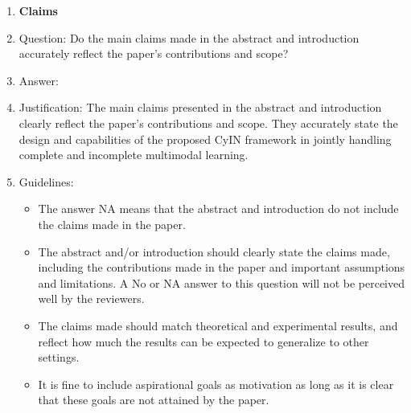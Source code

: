 \documentclass{article}
\begin{document}
\begin{enumerate}

\item {\bf Claims}
    \item[] Question: Do the main claims made in the abstract and introduction accurately reflect the paper's contributions and scope?
    \item[] Answer: \answerYes{} %
    \item[] Justification: The main claims presented in the abstract and introduction clearly reflect the paper’s contributions and scope. They accurately state the design and capabilities of the proposed CyIN framework in jointly handling complete and incomplete multimodal learning.
    \item[] Guidelines:
    \begin{itemize}
        \item The answer NA means that the abstract and introduction do not include the claims made in the paper.
        \item The abstract and/or introduction should clearly state the claims made, including the contributions made in the paper and important assumptions and limitations. A No or NA answer to this question will not be perceived well by the reviewers. 
        \item The claims made should match theoretical and experimental results, and reflect how much the results can be expected to generalize to other settings. 
        \item It is fine to include aspirational goals as motivation as long as it is clear that these goals are not attained by the paper. 
    \end{itemize}


\end{enumerate}
\end{document}
